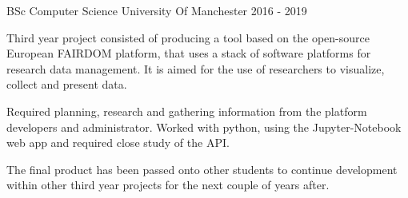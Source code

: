 \begin{cventries}

\cventry
    {BSc Computer Science} %
    {University Of Manchester} %
    {} %
    {2016 - 2019} %
    {
    \begin{cvitems}
        \item{Third year project consisted of producing a tool based on the open-source European FAIRDOM platform, that uses a stack of software platforms for research data management. It is aimed for the use of researchers to visualize, collect and present data.}
        \item{Required planning, research and gathering information from the platform developers and administrator. Worked with python, using the Jupyter-Notebook web app and required close study of the API.}
        \item{The final product has been passed onto other students to continue development within other third year projects for the next couple of years after.}
    \end{cvitems}
    }

\end{cventries}
